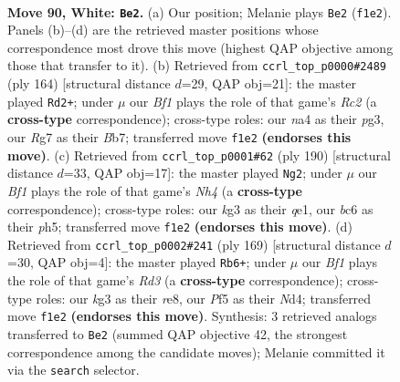 \documentclass[11pt]{article}
\begin{document}
\clearpage

\begin{figure}[p]\centering
\begin{subfigure}{0.46\textwidth}\centering
\resizebox{\linewidth}{!}{%
\newchessgame
\chessboard[
  setfen={8/2N3R1/2b5/5P2/np4P1/6k1/8/5BK1 w - - 2 90},
  showmover=false,
  pgfstyle=straightmove, color=movearrow, markmove={f1-e2}
]}
\caption{}
\end{subfigure}\hfill
\begin{subfigure}{0.46\textwidth}\centering
\resizebox{\linewidth}{!}{%
\newchessgame
\chessboard[
  setfen={5r2/1Bb5/2P5/3k4/8/4K1p1/2R5/8 w - - 10 83},
  showmover=false,
  pgfstyle=straightmove, color=movearrow, markmove={c2-d2}
]}
\caption{}
\end{subfigure}
\\[4pt]
\begin{subfigure}{0.46\textwidth}\centering
\resizebox{\linewidth}{!}{%
\newchessgame
\chessboard[
  setfen={8/7k/8/7p/7N/6P1/2R2P1K/4q3 w - - 55 96},
  showmover=false,
  pgfstyle=straightmove, color=movearrow, markmove={h4-g2}
]}
\caption{}
\end{subfigure}\hfill
\begin{subfigure}{0.46\textwidth}\centering
\resizebox{\linewidth}{!}{%
\newchessgame
\chessboard[
  setfen={4R3/8/3r4/4pk2/3n3P/8/1K1B4/8 b - - 17 85},
  showmover=false,
  pgfstyle=straightmove, color=movearrow, markmove={d6-b6}
]}
\caption{}
\end{subfigure}
\caption{\textbf{Move 90, White: \texttt{Be2}.} (a) Our position; Melanie plays \texttt{Be2} (\texttt{f1e2}). Panels (b)--(d) are the retrieved master positions whose correspondence most drove this move (highest QAP objective among those that transfer to it). (b) Retrieved from \texttt{ccrl\_top\_p0000\#2489} (ply 164) [structural distance $d$=29, QAP obj=21]: the master played \texttt{Rd2+}; under $\mu$ our \emph{Bf1} plays the role of that game's \emph{Rc2} (a \textbf{cross-type} correspondence); cross-type roles: our \emph{n}a4 as their \emph{p}g3, our \emph{R}g7 as their \emph{B}b7; transferred move \texttt{f1e2} \textbf{(endorses this move)}. (c) Retrieved from \texttt{ccrl\_top\_p0001\#62} (ply 190) [structural distance $d$=33, QAP obj=17]: the master played \texttt{Ng2}; under $\mu$ our \emph{Bf1} plays the role of that game's \emph{Nh4} (a \textbf{cross-type} correspondence); cross-type roles: our \emph{k}g3 as their \emph{q}e1, our \emph{b}c6 as their \emph{p}h5; transferred move \texttt{f1e2} \textbf{(endorses this move)}. (d) Retrieved from \texttt{ccrl\_top\_p0002\#241} (ply 169) [structural distance $d$=30, QAP obj=4]: the master played \texttt{Rb6+}; under $\mu$ our \emph{Bf1} plays the role of that game's \emph{Rd3} (a \textbf{cross-type} correspondence); cross-type roles: our \emph{k}g3 as their \emph{r}e8, our \emph{P}f5 as their \emph{N}d4; transferred move \texttt{f1e2} \textbf{(endorses this move)}. Synthesis: 3 retrieved analogs transferred to \texttt{Be2} (summed QAP objective 42, the strongest correspondence among the candidate moves); Melanie committed it via the \texttt{search} selector.}
\label{fig:thought-m178}
\end{figure}
\end{document}
